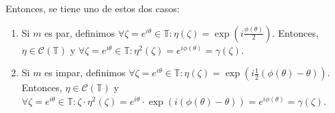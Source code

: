 \begin{dem}
    Entonces, se tiene uno de estos dos casos:
    \begin{enumerate}[label=\Roman*.]
        \item Si $m$ es par, definimos $\forall \zeta = e^{i\theta} \in \mathbb{T} : \eta(\zeta) = \exp \left( i \frac{\phi(\theta)}{2} \right)$. Entonces, $\eta \in \mathcal{C}\left(\mathbb{T} \right)$ y $\forall \zeta = e^{i\theta} \in \mathbb{T} : \eta^2(\zeta) = e^{i\phi(\theta)} = \gamma(\zeta)$.
        \item Si $m$ es impar, definimos $\forall \zeta = e^{i\theta} \in \mathbb{T} : \eta(\zeta) = \exp \left( i \frac{1}{2} \left(\phi(\theta) - \theta\right)\right)$. Entonces, $\eta \in \mathcal{C}\left(\mathbb{T} \right)$ y $\forall \zeta = e^{i\theta} \in \mathbb{T} : \zeta \cdot \eta^2(\zeta) = e^{i\theta} \cdot \exp \left( i \left(\phi(\theta) - \theta\right) \right) = e^{i\phi(\theta)} = \gamma(\zeta)$.
    \end{enumerate}

    \vspace{-\baselineskip}
    \hfill\qedsymbol
\end{dem}

